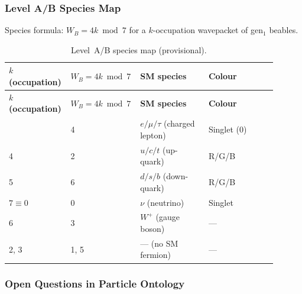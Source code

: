 \subsubsection{Level A/B Species Map}
\label{sec:mi-ontology-species-map}

Species formula: $W_B = 4k \bmod 7$ for a $k$-occupation wavepacket of gen$_1$ beables.

\begingroup\footnotesize\renewcommand{\arraystretch}{1.2}
\begin{longtable}{@{}P{0.18\linewidth}P{0.22\linewidth}P{0.25\linewidth}P{0.25\linewidth}@{}}
\caption{Level~A/B species map (provisional).}
\label{tab:mi-species-map}\\
\toprule
\textbf{$k$ (occupation)} & \textbf{$W_B = 4k \bmod 7$} &
  \textbf{SM species} & \textbf{Colour} \\
\midrule
\endfirsthead
\midrule
\textbf{$k$ (occupation)} & \textbf{$W_B = 4k \bmod 7$} &
  \textbf{SM species} & \textbf{Colour} \\
\midrule
\endhead
\bottomrule
{} & 4 & $e/\mu/\tau$ (charged lepton) & Singlet (0) \\
4 & 2 & $u/c/t$ (up-quark) & R/G/B \\
5 & 6 & $d/s/b$ (down-quark) & R/G/B \\
$7 \equiv 0$ & 0 & $\nu$ (neutrino) & Singlet \\
6 & 3 & $W^+$ (gauge boson) & --- \\
2, 3 & 1, 5 & --- (no SM fermion) & --- \\
\end{longtable}
\endgroup

\subsubsection{Open Questions in Particle Ontology}
\label{sec:mi-ontology-open}

